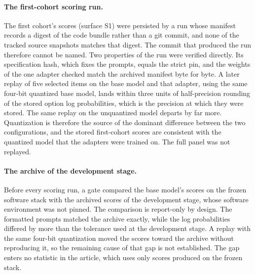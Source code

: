 \documentclass[12pt]{article}
\begin{document}
\paragraph{The first-cohort scoring run.} The first cohort's scores (surface S1) were persisted by a run whose manifest records a digest of the code bundle rather than a git commit, and none of the tracked source snapshots matches that digest. The commit that produced the run therefore cannot be named. Two properties of the run were verified directly. Its specification hash, which fixes the prompts, equals the strict pin, and the weights of the one adapter checked match the archived manifest byte for byte. A later replay of five selected items on the base model and that adapter, using the same four-bit quantized base model, lands within three units of half-precision rounding of the stored option log probabilities, which is the precision at which they were stored. The same replay on the unquantized model departs by far more. Quantization is therefore the source of the dominant difference between the two configurations, and the stored first-cohort scores are consistent with the quantized model that the adapters were trained on. The full panel was not replayed.

\paragraph{The archive of the development stage.} Before every scoring run, a gate compared the base model's scores on the frozen software stack with the archived scores of the development stage, whose software environment was not pinned. The comparison is report-only by design. The formatted prompts matched the archive exactly, while the log probabilities differed by more than the tolerance used at the development stage. A replay with the same four-bit quantization moved the scores toward the archive without reproducing it, so the remaining cause of that gap is not established. The gap enters no statistic in the article, which uses only scores produced on the frozen stack.
\end{document}
